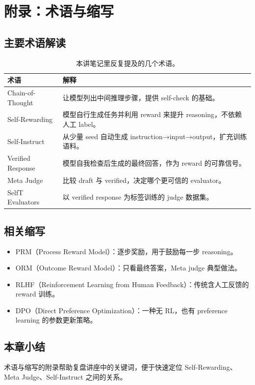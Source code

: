 \section{附录：术语与缩写}
\subsection{主要术语解读}
\begin{table}[H]
\centering
\begin{tabular}{p{4cm}p{11cm}}
\toprule
术语 & 解释 \\
\midrule
Chain-of-Thought & 让模型列出中间推理步骤，提供 self-check 的基础。 \\
Self-Rewarding & 模型自行生成任务并利用 reward 来提升 reasoning，不依赖人工 label。 \\
Self-Instruct & 从少量 seed 自动生成 instruction→input→output，扩充训练语料。 \\
Verified Response & 模型自我检查后生成的最终回答，作为 reward 的可靠信号。 \\
Meta Judge & 比较 draft 与 verified，决定哪个更可信的 evaluator。 \\
SelfT Evaluators & 以 verified response 为标签训练的 judge 数据集。 \\
\bottomrule
\end{tabular}
\caption{本讲笔记里反复提及的几个术语。}
\end{table}

\subsection{相关缩写}
\begin{itemize}
    \item PRM（Process Reward Model）：逐步奖励，用于鼓励每一步 reasoning。
    \item ORM（Outcome Reward Model）：只看最终答案，Meta judge 典型做法。
    \item RLHF（Reinforcement Learning from Human Feedback）：传统含人工反馈的 reward 训练。
    \item DPO（Direct Preference Optimization）：一种无 RL，也有 preference learning 的参数更新策略。
\end{itemize}

\subsection{本章小结}
术语与缩写的附录帮助复盘讲座中的关键词，便于快速定位 Self-Rewarding、Meta Judge、Self-Instruct 之间的关系。

